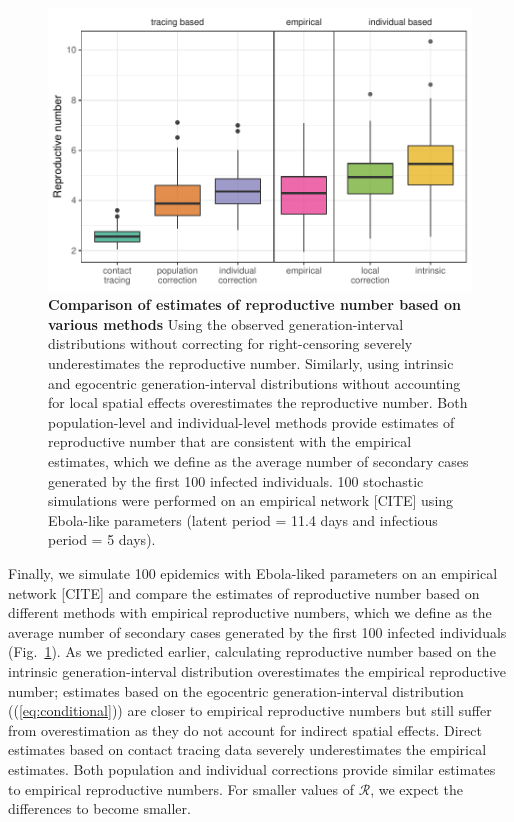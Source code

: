 \documentclass[12pt]{article}
\newcommand{\eref}[1]{(\ref{eq:#1})}
\newcommand{\fref}[1]{Fig.~\ref{fig:#1}}
\newcommand{\RR}{\ensuremath{{\mathcal R}}}
\begin{document}
\begin{figure}
\includegraphics[width=\textwidth]{../fig/cmp_reproductive.pdf}
\caption{\textbf{Comparison of estimates of reproductive number based on various methods}
Using the observed generation-interval distributions without correcting for right-censoring severely underestimates the reproductive number.
Similarly, using intrinsic and egocentric generation-interval distributions without accounting for local spatial effects overestimates the reproductive number.
Both population-level and individual-level methods provide estimates of reproductive number that are consistent with the empirical estimates, which we define as the average number of secondary cases generated by the first 100 infected individuals.
100 stochastic simulations were performed on an empirical network [CITE] using Ebola-like parameters (latent period = 11.4 days and infectious period = 5 days).
}
\label{fig:cmp}
\end{figure}

Finally, we simulate 100 epidemics with Ebola-liked parameters on an empirical network [CITE] and compare the estimates of reproductive number based on different methods with empirical reproductive numbers, which we define as the average number of secondary cases generated by the first 100 infected individuals (\fref{cmp}).
As we predicted earlier, calculating reproductive number based on the intrinsic generation-interval distribution overestimates the empirical reproductive number;
estimates based on the egocentric generation-interval distribution (\eref{conditional}) are closer to empirical reproductive numbers but still suffer from overestimation as they do not account for indirect spatial effects.
Direct estimates based on contact tracing data severely underestimates the empirical estimates.
Both population and individual corrections provide similar estimates to empirical reproductive numbers.
For smaller values of \RR, we expect the differences to become smaller. 
\end{document}
